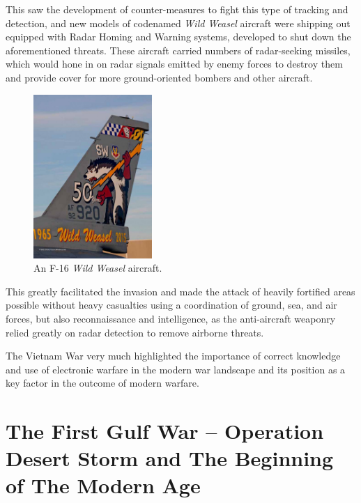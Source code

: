 \documentclass[english,purist]{ist-report}
\begin{document}
This saw the development of counter-measures to fight this type of tracking and detection, and new models of codenamed \textit{Wild Weasel} aircraft were shipping out equipped with Radar Homing and Warning systems, developed to shut down the aforementioned threats. These aircraft carried numbers of radar-seeking missiles, which would hone in on radar signals emitted by enemy forces to destroy them and provide cover for more ground-oriented bombers and other aircraft.
\begin{figure}[ht]
    \centering
    \includegraphics[width=0.4\textwidth]{wildweasel}
    \caption{An F-16 \textit{Wild Weasel} aircraft.}
    \label{fig:wildweasel}
\end{figure}

This greatly facilitated the invasion and made the attack of heavily fortified areas possible without heavy casualties using a coordination of ground, sea, and air forces, but also reconnaissance and intelligence, as the anti-aircraft weaponry relied greatly on radar detection to remove airborne threats.

The Vietnam War very much highlighted the importance of correct knowledge and use of electronic warfare in the modern war landscape and its position as a key factor in the outcome of modern warfare.

\section{The First Gulf War -- Operation Desert Storm and The Beginning of The Modern Age}
\end{document}

